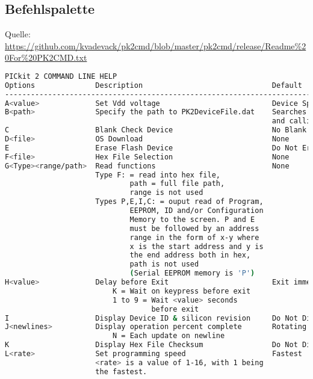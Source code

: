 \subsection{Befehlspalette}
\label{sub:commands}
Quelle: \url{https://github.com/kvadevack/pk2cmd/blob/master/pk2cmd/release/Readme%20For%20PK2CMD.txt}
\begin{center}
\begin{lstlisting}[language=bash]
PICkit 2 COMMAND LINE HELP
Options              Description                              Default
-------------------------------------------------------------------------------
A<value>             Set Vdd voltage                          Device Specific
B<path>              Specify the path to PK2DeviceFile.dat    Searches PATH
                                                              and calling dir
C                    Blank Check Device                       No Blank Check
D<file>              OS Download                              None
E                    Erase Flash Device                       Do Not Erase
F<file>              Hex File Selection                       None
G<Type><range/path>  Read functions                           None
                     Type F: = read into hex file,
                             path = full file path,
                             range is not used
                     Types P,E,I,C: = ouput read of Program,
                             EEPROM, ID and/or Configuration
                             Memory to the screen. P and E
                             must be followed by an address
                             range in the form of x-y where
                             x is the start address and y is
                             the end address both in hex,
                             path is not used
                             (Serial EEPROM memory is 'P')
H<value>             Delay before Exit                        Exit immediately
                         K = Wait on keypress before exit
                         1 to 9 = Wait <value> seconds
                                  before exit
I                    Display Device ID & silicon revision     Do Not Display
J<newlines>          Display operation percent complete       Rotating slash
                         N = Each update on newline
K                    Display Hex File Checksum                Do Not Display
L<rate>              Set programming speed                    Fastest
                     <rate> is a value of 1-16, with 1 being
                     the fastest.


\end{lstlisting}
\end{center}
